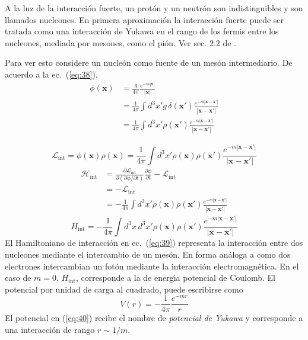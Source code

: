 A la luz de la interacci\'on fuerte, un prot\'on y un neutr\'on son
indistinguibles y son llamados nucleones. En primera aproximaci\'on la
interacci\'on fuerte puede ser tratada como una interacci\'on de Yukawa en
el rango de los fermis entre los nucleones, mediada por mesones, como el pi\'on. Ver sec. 2.2 de \cite{Aitchison:2003tq}.


Para ver esto considere un nucle\'on como fuente de un mes\'on
intermediario. De acuerdo a la ec.~(\ref{eq:38}),
\begin{align}
  \phi(\mathbf{x})&=\frac{g}{4\pi}\frac{e^{-m|\mathbf{x}|}}{|\mathbf{x}|}\nonumber\\
  &=\frac{1}{4\pi}\int d^3x'g\,\delta(\mathbf{x}')\frac{e^{-m|\mathbf{x}-\mathbf{x}'|}}{|\mathbf{x}-\mathbf{x}'|}\nonumber\\
  &=\frac{1}{4\pi}\int d^3x'\rho(\mathbf{x}')\frac{e^{-m|\mathbf{x}-\mathbf{x}'|}}{|\mathbf{x}-\mathbf{x}'|}
\end{align}

\begin{equation}
  \mathcal{L}_{\text{int}}=\phi(\mathbf{x})\rho(\mathbf{x})=\frac{1}{4\pi}\int d^3x'\rho(\mathbf{x})\rho(\mathbf{x}')\frac{e^{-m|\mathbf{x}-\mathbf{x}'|}}{|\mathbf{x}-\mathbf{x}'|}
\end{equation}
\begin{align}
  \mathcal{H}_{\text{int}}&=\frac{\partial\mathcal{L}_{\text{int}}}{\partial(\partial\phi/\partial t)}\frac{\partial\phi}{\partial t}-\mathcal{L}_{\text{int}}\nonumber\\
  &=-\mathcal{L}_{\text{int}}\nonumber\\
  &=-\frac{1}{4\pi}\int d^3x'\rho(\mathbf{x})\rho(\mathbf{x}')\frac{e^{-m|\mathbf{x}-\mathbf{x}'|}}{|\mathbf{x}-\mathbf{x}'|}
\end{align}
\begin{equation}
  \label{eq:39}
  H_{\text{int}}=-\frac{1}{4\pi}\int d^3x\,d^3x'\rho(\mathbf{x})\rho(\mathbf{x}')\frac{e^{-m|\mathbf{x}-\mathbf{x}'|}}{|\mathbf{x}-\mathbf{x}'|}
\end{equation}
El Hamiltoniano de interacci\'on en ec.~(\ref{eq:39}) representa la
interacci\'on entre dos nucleones mediante el intercambio de un mes\'on.
En forma an\'aloga a como dos electrones intercambian un fot\'on mediante
la interacci\'on electromagn\'etica. En el caso de $m=0$,
$H_{\text{int}}$, corresponde a la de energ\'\i a potencial de Coulomb. El
potencial por unidad de carga al cuadrado, puede escribirse como
\begin{equation}
  \label{eq:40}
    V(r)=-\frac{1}{4\pi}\frac{e^{-mr}}{r}
\end{equation}
El potencial en (\ref{eq:40}) recibe el nombre de \emph{potencial de
  Yukawa} y corresponde a una interacci\'on de rango $r\sim1/m$. 

